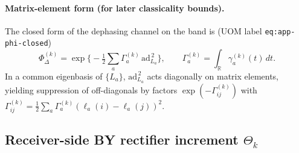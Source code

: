 \documentclass[11pt]{article}
\theoremstyle{definition}
\theoremstyle{plain}
\theoremstyle{remark}
\newcommand{\ad}{\mathrm{ad}}
\begin{document}
\paragraph{Matrix-element form (for later classicality bounds).}
The closed form of the dephasing channel on the band is (UOM label \texttt{eq:app-phi-closed})
\begin{equation}
\Phi_\Delta^{(k)}=\exp\!\Big\{-\tfrac12\sum_a \Gamma_a^{(k)}\,\ad_{L_a}^{\,2}\Big\},
\qquad
\Gamma_a^{(k)}=\int_{\mathbb R}\gamma_a^{(k)}(t)\,dt.
\label{eq:qnd-channel-closed}
\end{equation}
In a common eigenbasis of $\{L_a\}$, $\ad_{L_a}^{\,2}$ acts diagonally on matrix elements, yielding suppression of
off-diagonals by factors $\exp(-\Gamma^{(k)}_{ij})$ with
$\Gamma^{(k)}_{ij}=\tfrac12\sum_a\Gamma_a^{(k)}(\ell_a(i)-\ell_a(j))^2$.

\subsection{Receiver-side BY rectifier increment $\Theta_k$}
\label{subsec:theta}
\end{document}
